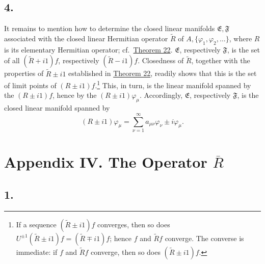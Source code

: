 ﻿\documentclass[paper=b5,fontsize=13pt,bookmarkpackage=false,twoside]{scrartcl}
\begin{document}
\subsection*{4.}
\label{appIII:4}

It remains to mention how to determine the closed linear manifolds
\(\mathfrak E,\mathfrak F\) associated with the closed linear Hermitian
operator \(\widetilde R\) of
\(A,\{\varphi_1,\varphi_2,\ldots\}\), where \(R\) is its elementary
Hermitian operator; cf.\ \hyperref[thm:22]{Theorem 22}.
\(\mathfrak E\), respectively \(\mathfrak F\), is the set of all
\((\widetilde R+i1)f\), respectively \((\widetilde R-i1)f\).
Closedness of \(\widetilde R\), together with the properties of
\(\widetilde R\pm i1\) established in \hyperref[thm:22]{Theorem 22}, readily shows that
this is the set of limit points of \((R\pm i1)f\).\footnote{\label{fn:76}If a
sequence \((\widetilde R\pm i1)f\) converges, then so does
\(U^{\pm1}(\widetilde R\pm i1)f=(\widetilde R\mp i1)f\); hence \(f\) and
\(\widetilde Rf\) converge.  The converse is immediate: if \(f\) and
\(\widetilde Rf\) converge, then so does
\((\widetilde R\pm i1)f\).}
This, in turn, is the linear manifold spanned by the
\((R\pm i1)f\), hence by the \((R\pm i1)\varphi_\mu\).
Accordingly, \(\mathfrak E\), respectively \(\mathfrak F\), is the
closed linear manifold spanned by
\[
  (R\pm i1)\varphi_\mu
  =\sum_{\nu=1}^{\infty}a_{\mu\nu}\varphi_\nu
   \pm i\varphi_\mu.
\]

\section*{Appendix IV. The Operator \texorpdfstring{\(\overline R\)}{R-bar}}
\label{app:IV}

\subsection*{1.}
\label{appIV:1}
\end{document}
